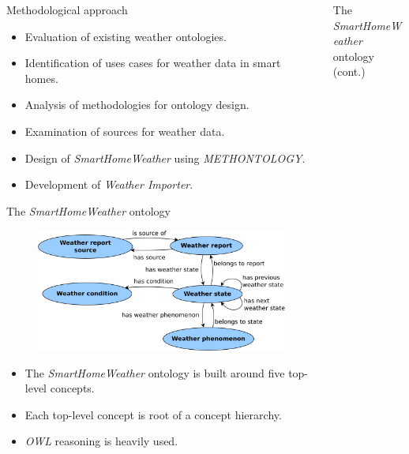 \documentclass[final,hyperref={pdfpagelabels=true}]{beamer}
\begin{document}
\begin{frame}[fragile]
\begin{columns}[t]
\begin{column}{.45\textwidth}
      \begin{block}{Methodological approach}
	\vspace{-.5em}
	\begin{itemize}
	  \item Evaluation of existing weather ontologies.
	  \item Identification of uses cases for weather data in smart homes.
	  \item Analysis of methodologies for ontology design.
	  \item Examination of sources for weather data.
	  \item Design of \emph{SmartHomeWeather} using \emph{METHONTOLOGY}. %
	  \item Development of \emph{Weather Importer}.
	\end{itemize}
      \end{block}

      \begin{block}{The \emph{SmartHomeWeather} ontology}
        \begin{figure}
	  \vspace{-.5em}
	  \centering
  	  \includegraphics[width=.45\textwidth]{figures/dia/binary-relations}
	\end{figure}

	\vspace{-1.5em}

	\begin{itemize}
	  \item The \emph{SmartHomeWeather} ontology is built around five top-level concepts.
	  \item Each top-level concept is root of a concept hierarchy.
	  \item \emph{OWL} reasoning is heavily used.
	\end{itemize}
      \end{block}
    \end{column}

    \begin{column}{.45\textwidth}
      \begin{block}{The \emph{SmartHomeWeather} ontology (cont.)}
	\vspace{-1.5em}


\end{block}
\end{column}
\end{columns}
\end{frame}
\end{document}
